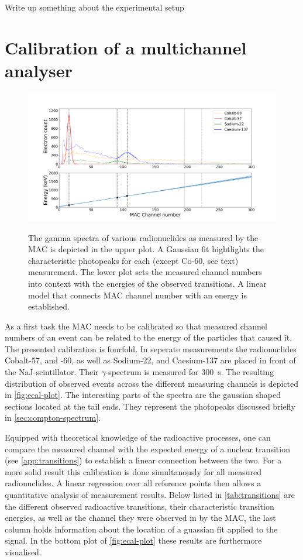 
\todo Write up something about the experimental setup

\section{Calibration of a multichannel analyser}
\label{sec:ecal}

\begin{figure}
	\label{fig:ecal-plot}
	\includegraphics[width=1.0\textwidth]{./fig/ecal-plot.png}
	\caption{}{The gamma spectra of various radionuclides as measured by the MAC
	is depicted in the upper plot. A Gaussian fit hightlights the characteristic
	photopeaks for each (except Co-60, see text) measurement. The lower plot
	sets the measured channel numbers into context with the energies of the
	observed transitions. A linear model that connects MAC channel number with an
	energy is established.}
\end{figure}

As a first task the MAC needs to be calibrated so that measured channel numbers of an
event can be related to the energy of the particles that caused it. The presented
calibration is fourfold. In seperate measurements the radionuclides Cobalt-57, and
-60, as well as Sodium-22, and Caesium-137 are placed in front of the
NaJ-scintillator. Their $\gamma$-spectrum is measured for \SI{300}{\second}. The
resulting distribution of observed events across the different measuring channels is
depicted in \autoref{fig:ecal-plot}. The interesting parts of the spectra are the
gaussian shaped sections located at the tail ends. They represent the photopeaks
discussed briefly in \autoref{sec:compton-spectrum}.

Equipped with theoretical knowledge of the radioactive processes, one can compare the
measured channel with the expected energy of a nuclear transition (see \todo
\autoref{app:transitions}) to establish a linear connection between the two. For a
more solid result this calibration is done simultanously for all measured
radionuclides. A linear regression over all reference points then allows a 
quantitative analysis of measurement results. Below listed in 
\autoref{tab:transitions} are the different observed radioactive transitions, their 
characteristic transition energies, as well as the channel they were observed in by 
the MAC, the last column holds information about the location of a guassian fit 
applied to the signal. In the bottom plot of \autoref{fig:ecal-plot} these results 
are furthermore visualised.

